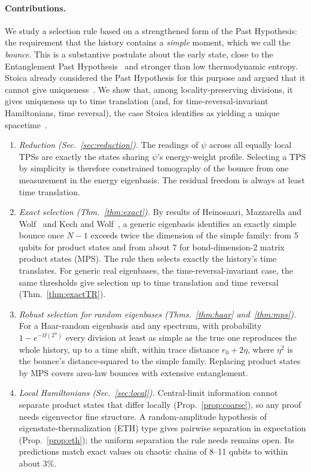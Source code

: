 \documentclass[11pt]{article}
\theoremstyle{definition}
\theoremstyle{remark}
\begin{document}
\paragraph{Contributions.} We study a selection rule based on a strengthened form of the Past Hypothesis: the requirement that the history contains a \emph{simple} moment, which we call the \emph{bounce}. This is a substantive postulate about the early state, close to the Entanglement Past Hypothesis~\cite{AlKhaliliChen2024} and stronger than low thermodynamic entropy. Stoica already considered the Past Hypothesis for this purpose and argued that it cannot give uniqueness~\cite[Sec.~VII.B]{Stoica2022}. We show that, among locality-preserving divisions, it gives uniqueness up to time translation (and, for time-reversal-invariant Hamiltonians, time reversal), the case Stoica identifies as yielding a unique spacetime~\cite[Remark~10 and Sec.~VII.E]{Stoica2022}.
\begin{enumerate}
\item \emph{Reduction (Sec.~\ref{sec:reduction}).} The readings of $\psi$ across all equally local TPSs are exactly the states sharing $\psi$'s energy-weight profile. Selecting a TPS by simplicity is therefore constrained tomography of the bounce from one measurement in the energy eigenbasis. The residual freedom is always at least time translation.
\item \emph{Exact selection (Thm.~\ref{thm:exact}).} By results of Heinosaari, Mazzarella and Wolf~\cite{HMW2013} and Kech and Wolf~\cite{KechWolf2017}, a generic eigenbasis identifies an exactly simple bounce once $N-1$ exceeds twice the dimension of the simple family: from 5 qubits for product states and from about 7 for bond-dimension-2 matrix product states (MPS). The rule then selects exactly the history's time translates. For generic real eigenbases, the time-reversal-invariant case, the same thresholds give selection up to time translation and time reversal (Thm.~\ref{thm:exactTR}).
\item \emph{Robust selection for random eigenbases (Thms.~\ref{thm:haar} and~\ref{thm:mps}).} For a Haar-random eigenbasis and any spectrum, with probability $1-e^{-\Omega(2^n)}$ every division at least as simple as the true one reproduces the whole history, up to a time shift, within trace distance $r_0+2\eta$, where $\eta^2$ is the bounce's distance-squared to the simple family. Replacing product states by MPS covers area-law bounces with extensive entanglement.
\item \emph{Local Hamiltonians (Sec.~\ref{sec:local}).} Central-limit information cannot separate product states that differ locally (Prop.~\ref{prop:coarse}), so any proof needs eigenvector fine structure. A random-amplitude hypothesis of eigenstate-thermalization (ETH) type gives pairwise separation in expectation (Prop.~\ref{prop:eth}); the uniform separation the rule needs remains open. Its predictions match exact values on chaotic chains of 8--11 qubits to within about 3\%.
\end{enumerate}
\end{document}

